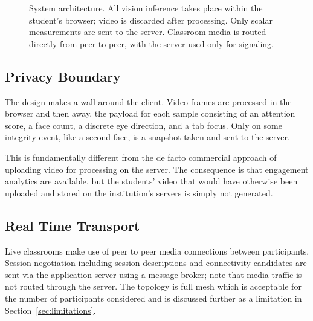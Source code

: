 \documentclass[conference]{IEEEtran}
\begin{document}
\begin{figure}[t]
{%
}
\caption{System architecture. All vision inference takes place within the
student's browser; video is discarded after processing. Only scalar
measurements are sent to the server. Classroom media is routed directly from
peer to peer, with the server used only for signaling.}
\label{fig:arch}
\end{figure}

\subsection{Privacy Boundary}

The design makes a wall around the client. Video frames are
processed in the browser and then away, the payload for each sample
consisting of an attention score, a face count, a discrete eye
direction, and a tab focus. Only on some integrity event, like a
second face, is a snapshot taken and sent to the server.

This is fundamentally different from the de facto commercial
approach of uploading video for processing on the server. The
consequence is that engagement analytics are available, but the
students' video that would have otherwise been uploaded and stored
on the institution's servers is simply not generated.

\subsection{Real Time Transport}

Live classrooms make use of peer to peer media connections between
participants. Session negotiation including session descriptions and
connectivity candidates are sent via the application server using a message
broker; note that media traffic is not routed through the server. The topology
is full mesh which is acceptable for the number of participants considered and
is discussed further as a limitation in Section~\ref{sec:limitations}.
\end{document}
